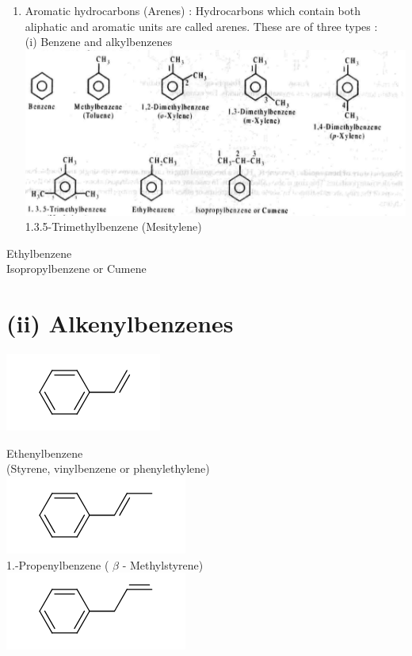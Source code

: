 \documentclass[10pt]{article}
\begin{document}
\begin{enumerate}
  \item Aromatic hydrocarbons (Arenes) : Hydrocarbons which contain both aliphatic and aromatic units are called arenes. These are of three types :\\
(i) Benzene and alkylbenzenes\\
\includegraphics[max width=\textwidth, center]{2025_01_28_8470952b98110cec3aabg-028}\\
1.3.5-Trimethylbenzene (Mesitylene)
\end{enumerate}

Ethylbenzene\\
Isopropylbenzene or Cumene

\section*{(ii) Alkenylbenzenes}
\includegraphics{smile-adc577b46455865de34c453a15df0549847037c4}

Ethenylbenzene\\
(Styrene, vinylbenzene or phenylethylene)\\
\includegraphics{smile-a184ae016d7cdf7cbc694684b90c0ab0e3379c59}\\
1.-Propenylbenzene ( $\beta$ - Methylstyrene)\\
\includegraphics{smile-ceb8732039bfccb42e0b608100c4e93c8310f5b1}
\end{document}

